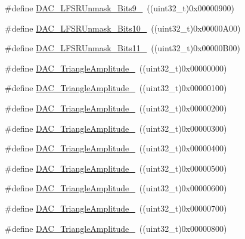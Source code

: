 \begin{DoxyCompactItemize}
\item 
\#define \hyperlink{group___d_a_c__lfsrunmask__triangleamplitude_gaf7f4540d9ec6efe074e1e4485f9a347a}{D\-A\-C\-\_\-\-L\-F\-S\-R\-Unmask\-\_\-\-Bits9\-\_}~((uint32\-\_\-t)0x00000900)
\item 
\#define \hyperlink{group___d_a_c__lfsrunmask__triangleamplitude_ga7670f0e10f062571d0e56027ef653228}{D\-A\-C\-\_\-\-L\-F\-S\-R\-Unmask\-\_\-\-Bits10\-\_}~((uint32\-\_\-t)0x00000\-A00)
\item 
\#define \hyperlink{group___d_a_c__lfsrunmask__triangleamplitude_gaeb9b5992b771f9a14587eeda58227831}{D\-A\-C\-\_\-\-L\-F\-S\-R\-Unmask\-\_\-\-Bits11\-\_}~((uint32\-\_\-t)0x00000\-B00)
\item 
\#define \hyperlink{group___d_a_c__lfsrunmask__triangleamplitude_ga49b1eddf4e6371b4be8751162dc94ac4}{D\-A\-C\-\_\-\-Triangle\-Amplitude\-\_}~((uint32\-\_\-t)0x00000000)
\item 
\#define \hyperlink{group___d_a_c__lfsrunmask__triangleamplitude_ga9798d68c3bbf0a57306bf2f962697377}{D\-A\-C\-\_\-\-Triangle\-Amplitude\-\_}~((uint32\-\_\-t)0x00000100)
\item 
\#define \hyperlink{group___d_a_c__lfsrunmask__triangleamplitude_gad3f31de1277836df1109576a53c47e87}{D\-A\-C\-\_\-\-Triangle\-Amplitude\-\_}~((uint32\-\_\-t)0x00000200)
\item 
\#define \hyperlink{group___d_a_c__lfsrunmask__triangleamplitude_ga42653712ce783d33ecb2f3e97e9c2ece}{D\-A\-C\-\_\-\-Triangle\-Amplitude\-\_}~((uint32\-\_\-t)0x00000300)
\item 
\#define \hyperlink{group___d_a_c__lfsrunmask__triangleamplitude_ga10b15745b749c62a56bd3d7bd5a27e1b}{D\-A\-C\-\_\-\-Triangle\-Amplitude\-\_}~((uint32\-\_\-t)0x00000400)
\item 
\#define \hyperlink{group___d_a_c__lfsrunmask__triangleamplitude_gaaae92dae9c4da55e29c645396825e36b}{D\-A\-C\-\_\-\-Triangle\-Amplitude\-\_}~((uint32\-\_\-t)0x00000500)
\item 
\#define \hyperlink{group___d_a_c__lfsrunmask__triangleamplitude_gaacec0af3f69db46f8984be3af9ecadfb}{D\-A\-C\-\_\-\-Triangle\-Amplitude\-\_}~((uint32\-\_\-t)0x00000600)
\item 
\#define \hyperlink{group___d_a_c__lfsrunmask__triangleamplitude_gadb404422c86a7b92d78e6d9617e8ce4d}{D\-A\-C\-\_\-\-Triangle\-Amplitude\-\_}~((uint32\-\_\-t)0x00000700)
\item 
\#define \hyperlink{group___d_a_c__lfsrunmask__triangleamplitude_ga565b0c97bbdf152756617d491bf8ef85}{D\-A\-C\-\_\-\-Triangle\-Amplitude\-\_}~((uint32\-\_\-t)0x00000800)

\end{DoxyCompactItemize}

